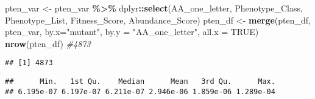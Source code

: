 \documentclass[
]{article}
\newenvironment{Shaded}{\begin{snugshade}}{\end{snugshade}}
\newcommand{\AttributeTok}[1]{\textcolor[rgb]{0.13,0.29,0.53}{#1}}
\newcommand{\CommentTok}[1]{\textcolor[rgb]{0.56,0.35,0.01}{\textit{#1}}}
\newcommand{\ConstantTok}[1]{\textcolor[rgb]{0.56,0.35,0.01}{#1}}
\newcommand{\FunctionTok}[1]{\textcolor[rgb]{0.13,0.29,0.53}{\textbf{#1}}}
\newcommand{\NormalTok}[1]{#1}
\newcommand{\OtherTok}[1]{\textcolor[rgb]{0.56,0.35,0.01}{#1}}
\newcommand{\SpecialCharTok}[1]{\textcolor[rgb]{0.81,0.36,0.00}{\textbf{#1}}}
\newcommand{\StringTok}[1]{\textcolor[rgb]{0.31,0.60,0.02}{#1}}
\begin{document}
\begin{Shaded}
\begin{Highlighting}[]
\NormalTok{pten\_var }\OtherTok{\textless{}{-}}\NormalTok{ pten\_var }\SpecialCharTok{\%\textgreater{}\%}\NormalTok{ dplyr}\SpecialCharTok{::}\FunctionTok{select}\NormalTok{(AA\_one\_letter, Phenotype\_Class, Phenotype\_List, Fitness\_Score, Abundance\_Score)}
\NormalTok{pten\_df }\OtherTok{\textless{}{-}} \FunctionTok{merge}\NormalTok{(pten\_df, pten\_var, }\AttributeTok{by.x=}\StringTok{"mutant"}\NormalTok{, }\AttributeTok{by.y =} \StringTok{"AA\_one\_letter"}\NormalTok{, }\AttributeTok{all.x =} \ConstantTok{TRUE}\NormalTok{)}
\FunctionTok{nrow}\NormalTok{(pten\_df) }\CommentTok{\#4873}
\end{Highlighting}
\end{Shaded}

\begin{verbatim}
## [1] 4873
\end{verbatim}

\begin{Shaded}
\end{Shaded}

\begin{verbatim}
##      Min.   1st Qu.    Median      Mean   3rd Qu.      Max. 
## 6.195e-07 6.197e-07 6.211e-07 2.946e-06 1.859e-06 1.289e-04
\end{verbatim}
\end{document}
